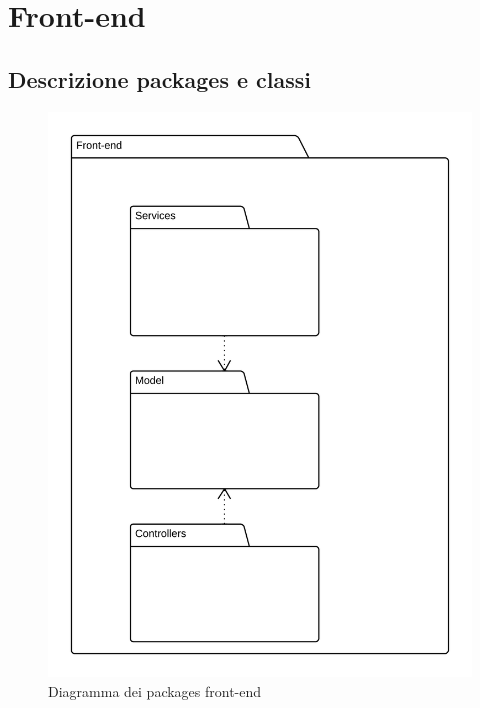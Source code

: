 \section{Front-end}

\subsection{Descrizione packages e classi}

\begin{figure}[H]
\centering
\includegraphics[width=\textwidth]{uml/Front-end-Diagramma dei packages.png}
\caption{Diagramma dei packages front-end}
\label{diagrammaClassiFrontEnd}
\end{figure}

%
